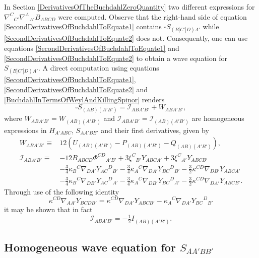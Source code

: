 \documentclass[10pt,a4paper]{article}
\theoremstyle{plain}
\begin{document}
In Section \ref{DerivativesOfTheBuchdahlZeroQuantity} two different expressions
for $ \nabla^{C}{}_{C'}\nabla^{A}{}_{A'}B_{ABCD}$ were computed.
 Observe that the right-hand side of equation
\eqref{SecondDerivativesOfBuchdahlToEquate1} contains $\square
S_{(B|C'|D)A'}$ while \eqref{SecondDerivativesOfBuchdahlToEquate2}
does not. Consequently, one can use equations
\eqref{SecondDerivativesOfBuchdahlToEquate1} and
\eqref{SecondDerivativesOfBuchdahlToEquate2} to obtain a wave equation
for $S_{(B|C'|D)A'}$.  A direct computation using equations
\eqref{SecondDerivativesOfBuchdahlToEquate1},
\eqref{SecondDerivativesOfBuchdahlToEquate2} and
\eqref{BuchdahlInTermsOfWeylAndKillingSpinor} renders
\begin{equation}\label{SymmetricWaveEqS2}
\square S_{(AB)(A'B')}= \mathcal{I}_{ABA'B'} + W_{ABA'B'},
\end{equation}
where $W_{ABA'B'} =W_{(AB)(A'B')}$ and $\mathcal{I}_{ABA'B'}=
\mathcal{I}_{(AB)(A'B')}$ are homogeneous expressions in $H_{A'ABC}$,
$S_{AA'BB'}$ and their first derivatives, given by
\begin{align*}
W_{ABA'B'}\equiv &
12\left(U_{(AB)(A'B')}-P_{(AB)(A'B')}-Q_{(AB)(A'B')}\right),\\ \mathcal{I}_{ABA'B'}
\equiv &-12 B_{ABCD} \Phi^{CD}{}_{A'B'} + 3 \xi^{C}{}_{B'} Y_{ABCA'} +
3 \xi^{C}{}_{A'} Y_{ABCB'} \\ &- \tfrac{3}{4} \kappa_{B}{}^{C}
\nabla_{DA'}Y_{AC}{}^{D}{}_{B'} - \tfrac{3}{4} \kappa_{A}{}^{C}
\nabla_{DA'}Y_{BC}{}^{D}{}_{B'} - \tfrac{3}{2} \kappa^{CD}
\nabla_{DB'}Y_{ABCA'} \\ &- \tfrac{3}{4} \kappa_{B}{}^{C}
\nabla_{DB'}Y_{AC}{}^{D}{}_{A'} - \tfrac{3}{4} \kappa_{A}{}^{C}
\nabla_{DB'}Y_{BC}{}^{D}{}_{A'}- \tfrac{3}{2} \kappa^{CD}
\nabla_{DA'}Y_{ABCB'}.
\end{align*}
Through use of the following identity
\begin{equation*}\label{SwappindicesKillingAndCotton}
\kappa^{CD} \nabla_{AA'}Y_{BCDB'} = \kappa^{CD} \nabla_{DA'}Y_{ABCB'}
- \kappa_{A}{}^{C} \nabla_{DA'}Y_{BC}{}^{D}{}_{B'}
\end{equation*}
it may be shown that in fact
\[\mathcal{I}_{ABA'B'}=-\tfrac{1}{2}I_{(AB)(A'B')}.\]


\subsection{Homogeneous wave equation for $S_{AA'BB'}$}
\end{document}
